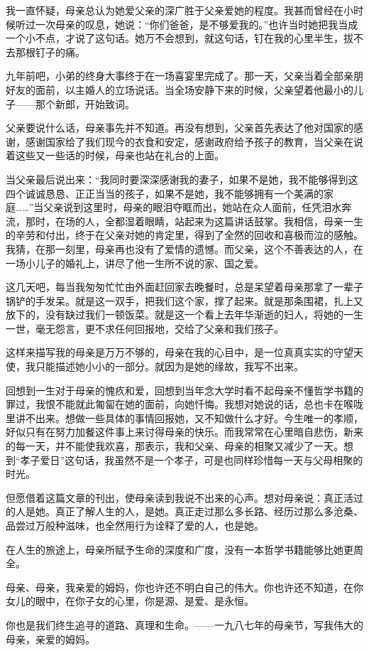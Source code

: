 \par 我一直怀疑，母亲总认为她爱父亲的深广胜于父亲爱她的程度。我甚而曾经在小时候听过一次母亲的叹息，她说：“你们爸爸，是不够爱我的。”也许当时她把我当成一个小不点，才说了这句话。她万不会想到，就这句话，钉在我的心里半生，拔不去那根钉子的痛。
\par 九年前吧，小弟的终身大事终于在一场喜宴里完成了。那一天，父亲当着全部亲朋好友的面前，以主婚人的立场说话。当全场安静下来的时候，父亲望着他最小的儿子——那个新郎，开始致词。
\par 父亲要说什么话，母亲事先并不知道。再没有想到，父亲首先表达了他对国家的感谢，感谢国家给了我们现今的衣食和安定，感谢政府给予孩子的教育，当父亲在说着这些又一些话的时候，母亲也站在礼台的上面。
\par 当父亲最后说出来：“我同时要深深感谢我的妻子，如果不是她，我不能够得到这四个诚诚恳恳、正正当当的孩子，如果不是她，我不能够拥有一个美满的家庭……”当父亲说到这里时，母亲的眼泪夺眶而出，她站在众人面前，任凭泪水奔流，那时，在场的人，全都湿着眼睛，站起来为这篇讲话鼓掌。我相信，母亲一生的辛劳和付出，终于在父亲对她的肯定里，得到了全然的回收和喜极而泣的感触。我猜，在那一刻里，母亲再也没有了爱情的遗憾。而父亲，这个不善表达的人，在一场小儿子的婚礼上，讲尽了他一生所不说的家、国之爱。
\par 这几天吧，每当我匆匆忙忙由外面赶回家去晚餐时，总是呆望着母亲那拿了一辈子锅铲的手发呆。就是这一双手，把我们这个家，撑了起来。就是那条围裙，扎上又放下的，没有缺过我们一顿饭菜。就是这一个看上去年华渐逝的妇人，将她的一生一世，毫无怨言，更不求任何回报地，交给了父亲和我们孩子。
\par 这样来描写我的母亲是万万不够的，母亲在我的心目中，是一位真真实实的守望天使，我只能描述她小小的一部分。就因为是她的缘故，我写不出来。
\par 回想到一生对于母亲的愧疚和爱，回想到当年念大学时看不起母亲不懂哲学书籍的罪过，我恨不能就此匍匐在她的面前，向她忏悔。我想对她说的话，总也卡在喉咙里讲不出来。想做一些具体的事情回报她，又不知做什么才好。今生唯一的孝顺，好似只有在努力加餐这件事上来讨得母亲的快乐。而我常常在心里暗自悲伤，新来的每一天，并不能使我欢喜，那表示，我和父亲、母亲的相聚又减少了一天。想到“孝子爱日”这句话，我虽然不是一个孝子，可是也同样珍惜每一天与父母相聚的时光。
\par 但愿借着这篇文章的刊出，使母亲读到我说不出来的心声。想对母亲说：真正活过的人是她。真正了解人生的人，是她。真正走过那么多长路、经历过那么多沧桑、品尝过万般种滋味，也全然用行为诠释了爱的人，也是她。
\par 在人生的旅途上，母亲所赋予生命的深度和广度，没有一本哲学书籍能够比她更周全。
\par 母亲、母亲，我亲爱的姆妈，你也许还不明白自己的伟大。你也许还不知道，在你女儿的眼中，在你子女的心里，你是源、是爱、是永恒。
\par 你也是我们终生追寻的道路、真理和生命。——一九八七年的母亲节，写我伟大的母亲，亲爱的姆妈。


